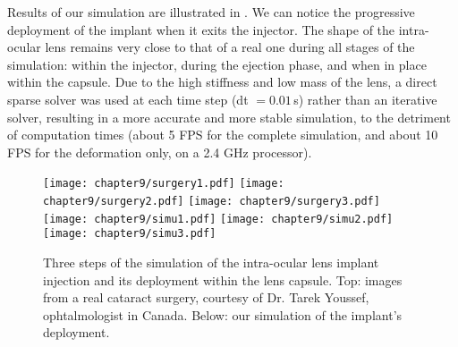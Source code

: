 Results of our simulation are illustrated in . We can notice the progressive deployment of the implant when it exits the injector.  The shape of the intra-ocular lens remains very close to that of a real one during all stages of the simulation: within the injector, during the ejection phase, and when in place within the capsule. Due to the high stiffness and low mass of the lens, a direct sparse solver was used at each time step (dt $= 0.01\,$s) rather than an iterative solver, resulting in a more accurate and more stable simulation, to the detriment of computation times (about 5 FPS for the complete simulation, and about 10 FPS for the deformation only, on a 2.4 GHz processor).

\begin{figure}[!h]
\centering
\texttt{[image: chapter9/surgery1.pdf]}
\hfill
\texttt{[image: chapter9/surgery2.pdf]}
\hfill
\texttt{[image: chapter9/surgery3.pdf]} \\
\vspace{0.1cm}
\texttt{[image: chapter9/simu1.pdf]}
\hfill
\texttt{[image: chapter9/simu2.pdf]}
\hfill
\texttt{[image: chapter9/simu3.pdf]}
\caption [Lens imlant] {Three steps of the simulation of the intra-ocular lens implant injection and its deployment within the lens capsule. Top: images from a real cataract surgery, courtesy of Dr. Tarek Youssef, ophtalmologist in Canada. Below: our simulation of the implant's deployment.}
\label{chap9:fig-simu-results}
\end{figure}

